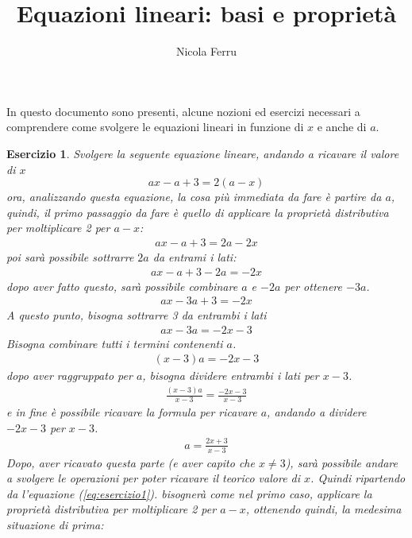 \documentclass{book}
\title{Equazioni lineari: basi e proprietà}
\author{Nicola Ferru}
\newtheorem{es}[section]{Esercizio}
\begin{document}
\maketitle
In questo documento sono presenti, alcune nozioni ed esercizi necessari a comprendere
come svolgere le equazioni lineari in funzione di $x$ e anche di $a$.
\begin{es}
  \label{es:esercizio1}
  Svolgere la seguente equazione lineare, andando a ricavare il valore di $x$
  \begin{equation}
    \label{eq:esercizio1}
    ax-a+3=2(a-x)
  \end{equation}
  ora, analizzando questa equazione, la cosa più immediata da fare è partire da $a$,
  quindi, il primo passaggio da fare è quello di applicare la proprietà distributiva
  per moltiplicare 2 per $a-x$:
  \begin{eqnarray*}
    ax-a+3=2a-2x
  \end{eqnarray*}
  poi sarà possibile sottrarre $2a$ da entrami i lati:
  \begin{eqnarray*}
    ax-a+3-2a=-2x
  \end{eqnarray*}
  dopo aver fatto questo, sarà possibile combinare $a$ e $-2a$ per ottenere $-3a$.
  \begin{eqnarray*}
    ax-3a+3=-2x
  \end{eqnarray*}
  A questo punto, bisogna sottrarre 3 da entrambi i lati
  \begin{eqnarray*}
    ax-3a=-2x-3
  \end{eqnarray*}
  Bisogna combinare tutti i termini contenenti $a$.
  \begin{eqnarray*}
    (x-3)a=-2x-3
  \end{eqnarray*}
  dopo aver raggruppato per $a$, bisogna dividere entrambi i lati
  per $x-3$.
  \begin{eqnarray*}
    \frac{(x-3)a}{x-3}=\frac{-2x-3}{x-3}
  \end{eqnarray*}
  e in fine è possibile ricavare la formula per ricavare $a$, andando a dividere
  $-2x-3$ per $x-3$.
  \begin{eqnarray*}
    a=\frac{2x+3}{x-3}
  \end{eqnarray*}
  Dopo, aver ricavato questa parte (e aver capito che $x\neq 3$), sarà possibile andare a
  svolgere le operazioni per poter ricavare il teorico valore di $x$. Quindi ripartendo da
  l'equazione (\ref{eq:esercizio1}). bisognerà come nel primo caso, applicare la
  proprietà distributiva per moltiplicare 2 per $a-x$, ottenendo quindi, la
  medesima situazione di prima:

\end{es}
\end{document}
